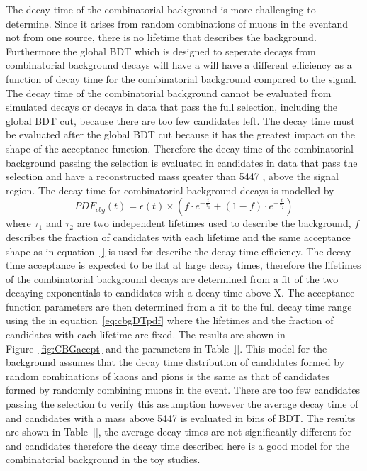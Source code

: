 {The decay time \pdf of the combinatorial background is more challenging to determine. Since it arises from random combinations of muons in the eventand not from one source, there is no lifetime that describes the background. Furthermore the global BDT which is designed to seperate \bsmumu decays from combinatorial background decays will have a will have a different efficiency as a function of decay time for the combinatorial background compared to the \bsmum signal. The decay time \pdf of the combinatorial background cannot be evaluated from simulated decays or decays in data that pass the full \bsmumu selection, including the global BDT cut, because there are too few candidates left. The decay time \pdf must be evaluated after the global BDT cut because it has the greatest impact on the shape of the acceptance function. Therefore the decay time \pdf of the combinatorial background passing the \bsmumu selection is evaluated in candidates in data that pass the \bhh selection and have a reconstructed mass greater than 5447 \mevcc, above the \bs signal region. The decay time \pdf for combinatorial background decays is modelled by
\begin{equation}
PDF_{cbg}(t) = \epsilon(t)\times \left( f \cdot e^{-\frac{t}{\tau_{1}}} + (1-f)\cdot e^{-\frac{t}{\tau_{2}}} \right)
\label{eq:cbgDTpdf}
\end{equation}
where $\tau_{1}$ and $\tau_{2}$ are two independent lifetimes used to describe the background, $f$ describes the fraction of candidates with each lifetime and the same acceptance shape as in equation~\ref{} is used for describe the decay time efficiency. The decay time acceptance is expected to be flat at large decay times, therefore the lifetimes of the combinatorial background decays are determined from a \ml fit of the two decaying exponentials to candidates with a decay time above X. The acceptance function parameters are then determined from a \ml fit to the full decay time range using the \pdf in equation~\ref{eq:cbgDTpdf} where the lifetimes and the fraction of candidates with each lifetime are fixed. The results are shown in Figure~\ref{fig:CBGaccpt} and the \pdf parameters in Table~\ref{}. This model for the background assumes that the decay time distribution of \bhh candidates formed by random combinations of kaons and pions is the same as that of \bsmumu candidates formed by randomly combining muons in the event. There are too few candidates passing the \bsmumu selection to verify this assumption however the average decay time of \bhh and \bsmumu candidates with a mass above 5447 \mevcc is evaluated in bins of BDT. The results are shown in Table~\ref{}, the average decay times are not significantly different for \bhh and \bsmumu candidates therefore the decay time \pdf described here is a good model for the combinatorial background in the toy studies.


}
